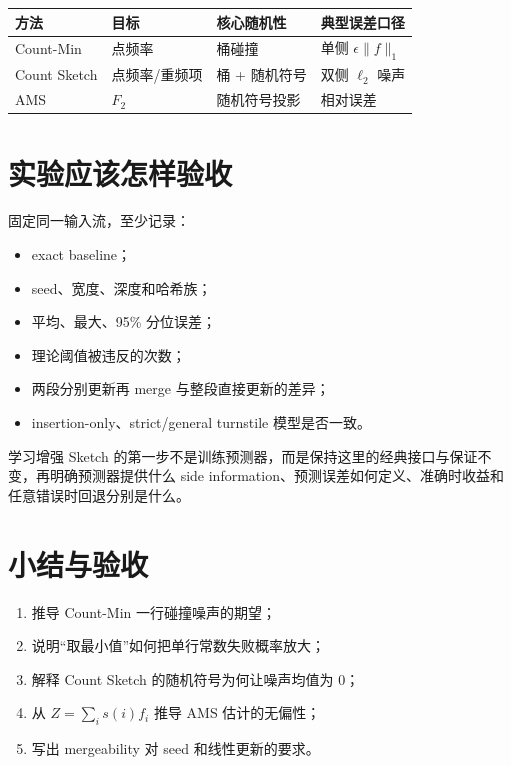 \begin{center}
\begin{tabularx}{\textwidth}{lXXX}
\toprule
方法 & 目标 & 核心随机性 & 典型误差口径\\
\midrule
Count-Min & 点频率 & 桶碰撞 & 单侧 $\epsilon\|f\|_1$\\
Count Sketch & 点频率/重频项 & 桶 + 随机符号 & 双侧 $\ell_2$ 噪声\\
AMS & $F_2$ & 随机符号投影 & 相对误差\\
\bottomrule
\end{tabularx}
\end{center}

\section{实验应该怎样验收}

固定同一输入流，至少记录：
\begin{itemize}
  \item exact baseline；
  \item seed、宽度、深度和哈希族；
  \item 平均、最大、95\% 分位误差；
  \item 理论阈值被违反的次数；
  \item 两段分别更新再 merge 与整段直接更新的差异；
  \item insertion-only、strict/general turnstile 模型是否一致。
\end{itemize}

\begin{aibox}
学习增强 Sketch 的第一步不是训练预测器，而是保持这里的经典接口与保证不变，再明确预测器提供什么 side information、预测误差如何定义、准确时收益和任意错误时回退分别是什么。
\end{aibox}

\section{小结与验收}

\begin{checkpointbox}
\begin{enumerate}
  \item 推导 Count-Min 一行碰撞噪声的期望；
  \item 说明“取最小值”如何把单行常数失败概率放大；
  \item 解释 Count Sketch 的随机符号为何让噪声均值为 0；
  \item 从 $Z=\sum_is(i)f_i$ 推导 AMS 估计的无偏性；
  \item 写出 mergeability 对 seed 和线性更新的要求。
\end{enumerate}
\end{checkpointbox}
